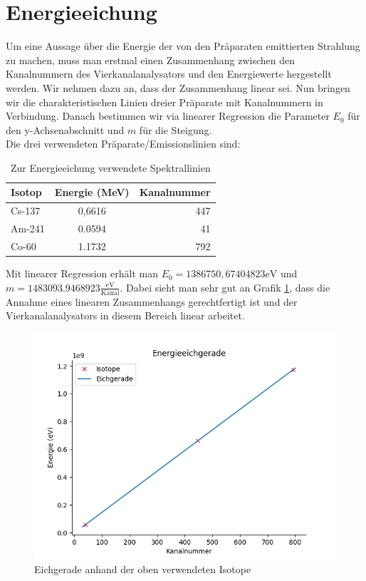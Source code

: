\section{Energieeichung}

Um eine Aussage über die Energie der von den Präparaten emittierten Strahlung zu machen, muss man erstmal einen Zusammenhang zwischen 
den Kanalnummern des Vierkanalanalysators und den Energiewerte hergestellt werden. Wir nehmen dazu an, dass der Zusammenhang linear sei. Nun bringen wir 
die charakteristischen Linien dreier Präparate mit Kanalnummern in Verbindung. Danach bestimmen 
wir via linearer Regression die Parameter $E_0$  für den y-Achsenabschnitt und $m$ für die Steigung.\\

Die drei verwendeten Präparate/Emissionslinien  sind:
 \begin{table}[h]
    \centering
     \begin{tabular}{lcr}
        Isotop & Energie (MeV) & Kanalnummer \\
        \toprule
         Cs-137 & 0,6616  & 447\\
         Am-241 & 0.0594 & 41\\
         Co-60 & 1.1732 & 792\\
     \end{tabular}
     \caption{Zur Energieeichung verwendete Spektrallinien}
     \label{Eichung}
 \end{table}

 Mit linearer Regression erhält man $E_0 = 1386750,67404823\mathrm{ eV}$ und $m = 1483093.9468923 \frac{\mathrm{eV}}{\mathrm{Kanal}}$.
 Dabei sieht man sehr gut an Grafik \ref{Eichgerade}, dass die Annahme eines linearen Zusammenhangs gerechtfertigt ist und der Vierkanalanalysators in 
 diesem Bereich linear arbeitet.

 \begin{figure}[ht]
     \centering
     \includegraphics[width = \linewidth]{Bilder/Auswertung/EnergieeichgeradeGamma.png}
     \caption{Eichgerade anhand der oben verwendeten Isotope}
     \label{Eichgerade}
 \end{figure}